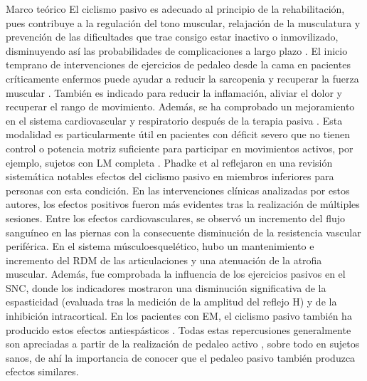 \begin{thesischapter}{1} {Marco teórico}
    \vspace{5pt}
    El ciclismo pasivo es adecuado al principio de la rehabilitación, pues contribuye a la regulación del tono muscular, relajación de la musculatura y prevención de las dificultades que trae consigo estar inactivo o inmovilizado, disminuyendo así las probabilidades de complicaciones a largo plazo \cite{cruz2009guia}. El inicio temprano de intervenciones de ejercicios de pedaleo desde la cama en pacientes críticamente enfermos puede ayudar a reducir la sarcopenia y recuperar la fuerza muscular \cite{nickels2020acceptability}. También es indicado para reducir la inflamación, aliviar el dolor y recuperar el rango de movimiento. Además, se ha comprobado un mejoramiento en el sistema cardiovascular y respiratorio después de la terapia pasiva \cite{cruz2009guia, phadke2019impact}. Esta modalidad es particularmente útil en pacientes con déficit severo que no tienen control o potencia motriz suficiente para participar en movimientos activos, por ejemplo, sujetos con LM completa \cite{phadke2019impact, nardone2017passive}. Phadke et al \cite{phadke2019impact} reflejaron en una revisión sistemática notables efectos del ciclismo pasivo en miembros inferiores para personas con esta condición. En las intervenciones clínicas analizadas por estos autores, los efectos positivos fueron más evidentes tras la realización de múltiples sesiones. Entre los efectos cardiovasculares, se observó un incremento del flujo sanguíneo en las piernas con la consecuente disminución de la resistencia vascular periférica. En el sistema músculoesquelético, hubo un mantenimiento e incremento del RDM de las articulaciones y una atenuación de la atrofia muscular. Además, fue comprobada la influencia de los ejercicios pasivos en el SNC, donde los indicadores mostraron una disminución significativa de la espasticidad (evaluada tras la medición de la amplitud del reflejo H) y de la inhibición intracortical. En los pacientes con EM, el ciclismo pasivo también ha producido estos efectos antiespásticos \cite{motl2006effect, guyot2012effects}. Todas estas repercusiones generalmente son apreciadas a partir de la realización de pedaleo activo \cite{nardone2016effects}, sobre todo en sujetos sanos, de ahí la importancia de conocer que el pedaleo pasivo también produzca efectos similares.


\end{thesischapter}
